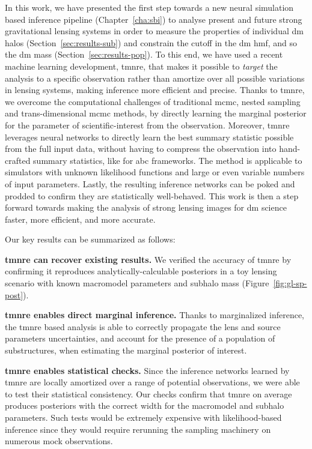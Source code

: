 In this work, we have presented the first step towards a new neural simulation based inference pipeline (Chapter~\ref{cha:sbi}) to analyse present and future strong gravitational lensing systems in order to measure the properties of individual \gls*{dm} halos (Section~\ref{sec:results-sub}) and constrain the cutoff in the \gls*{dm} \gls*{hmf}, and so the \gls*{dm} mass (Section~\ref{sec:results-pop}). To this end, we have used a recent machine learning development, \gls*{tmnre}, that makes it possible to \textit{target} the analysis to a specific observation rather than amortize over all possible variations in lensing systems, making inference more efficient and precise. Thanks to \gls*{tmnre}, we overcome the computational challenges of traditional \gls*{mcmc}, nested sampling and trans-dimensional \gls*{mcmc} methods, by directly learning the marginal posterior for the parameter of scientific-interest from the observation. Moreover, \gls*{tmnre} leverages neural networks to directly learn the best summary statistic possible from the full input data, without having to compress the observation into hand-crafted summary statistics, like for \gls*{abc} frameworks. The method is applicable to simulators with unknown likelihood functions and large or even variable numbers of input parameters. Lastly, the resulting inference networks can be poked and prodded to confirm they are statistically well-behaved.
This work is then a step forward towards making the analysis of strong lensing images for \gls*{dm} science faster, more efficient, and more accurate. 

\mbox{}

Our key results can be summarized as follows:

\noindent\textbf{\gls*{tmnre} can recover existing results.} We verified the accuracy of \gls*{tmnre} by confirming it reproduces analytically-calculable posteriors in a toy lensing scenario with known macromodel parameters and subhalo mass (Figure~\ref{fig:gl-sp-post}).

\noindent\textbf{\gls*{tmnre} enables direct marginal inference.} Thanks to marginalized inference, the \gls*{tmnre} based analysis is able to correctly propagate the lens and source parameters uncertainties, and  account for the presence of a population of substructures, when estimating the marginal posterior of interest. 

\noindent\textbf{\gls*{tmnre} enables statistical checks.} Since the inference networks learned by \gls*{tmnre} are locally amortized over a range of potential observations, we were able to test their statistical consistency. Our checks confirm that \gls*{tmnre} on average produces posteriors with the correct width for the macromodel and subhalo parameters. Such tests would be extremely expensive with likelihood-based inference since they would require rerunning the sampling machinery on numerous mock observations.

